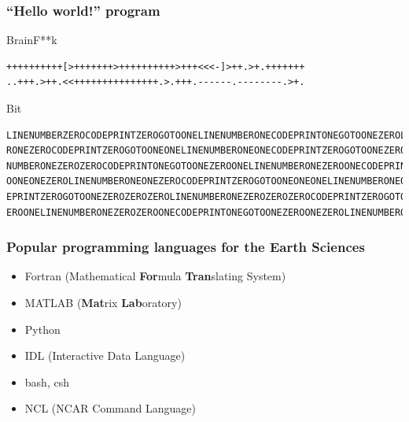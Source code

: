 \documentclass{beamer}
\begin{document}

\begin{frame}[fragile]
\frametitle{``Hello world!'' program}

\begin{block}{BrainF**k}
  \begin{lstlisting}
++++++++++[>+++++++>++++++++++>+++<<<-]>++.>+.+++++++
..+++.>++.<<+++++++++++++++.>.+++.------.--------.>+.

  \end{lstlisting}
\end{block}

\pause

\begin{block}{Bit}
  \begin{lstlisting}
LINENUMBERZEROCODEPRINTZEROGOTOONELINENUMBERONECODEPRINTONEGOTOONEZEROLINENUMBE
RONEZEROCODEPRINTZEROGOTOONEONELINENUMBERONEONECODEPRINTZEROGOTOONEZEROZEROLINE
NUMBERONEZEROZEROCODEPRINTONEGOTOONEZEROONELINENUMBERONEZEROONECODEPRINTZEROGOT
OONEONEZEROLINENUMBERONEONEZEROCODEPRINTZEROGOTOONEONEONELINENUMBERONEONEONECOD
EPRINTZEROGOTOONEZEROZEROZEROLINENUMBERONEZEROZEROZEROCODEPRINTZEROGOTOONEZEROZ
EROONELINENUMBERONEZEROZEROONECODEPRINTONEGOTOONEZEROONEZEROLINENUMBERONEZEROON

  \end{lstlisting}
\end{block}


\end{frame}


\begin{frame}[fragile]
\frametitle{Popular programming languages for the Earth Sciences}

\begin{itemize}
 \item Fortran (Mathematical \textbf{For}mula \textbf{Tran}slating System)
\pause
 \item MATLAB (\textbf{Mat}rix \textbf{Lab}oratory) 
\pause 
\item Python 
\pause 
\item IDL (Interactive Data Language)
\pause 
\item bash, csh
\pause 
\item NCL (NCAR Command Language)

\end{itemize}



\end{frame}



\end{document}

